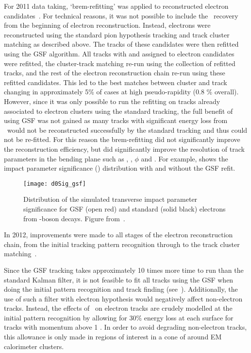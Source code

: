 For 2011 data taking, `brem-refitting' was applied to
reconstructed electron candidates~\cite{ATLAS-CONF-2012-047}. For technical reasons, it was not possible to
include the \brem\ recovery from the beginning of electron reconstruction.
Instead, electrons were reconstructed using the standard pion hypothesis
tracking and track cluster matching as described above. The tracks of these candidates were then refitted
using the GSF algorithm. All tracks with  and  assigned to
electron candidates were refitted, the cluster-track matching re-run
using the collection of refitted tracks, and the rest of the electron reconstruction
chain re-run using these refitted candidates. This led to the best matches between
cluster and track changing in approximately 5\% of cases at high pseudo-rapidity (0.8 \%
overall). However, since it was only possible to run the refitting on tracks
already associated to electron clusters using the standard tracking, the full
benefit of using GSF was not gained as many tracks with significant energy loss
from \brem\ would not be reconstructed successfully by the standard tracking and
thus could not be re-fitted. For this reason the brem-refitting did not
significantly improve the reconstruction efficiency, but did significantly
improve the resolution of track parameters in the bending plane such as \dzero, \dzerosig,
$\phi$ and \qoverp. For example,  shows the impact parameter
significance (\dzerosig) distribution with and without the GSF refit. 

\begin{figure}[h!]
\centering
            \texttt{[image: d0Sig\_gsf]}
\caption{
Distribution of the simulated transverse impact parameter significance for GSF (open
red) and standard (solid black) electrons from \Z-boson decays. 
Figure from~\cite{ATLAS-CONF-2012-047}.}
\label{fig:d0Sig-gsf}
\end{figure}


In 2012, improvements were made to all stages of the electron reconstruction
chain, from the initial tracking pattern recognition through to the track
cluster matching~\cite{HSG2:1456228}. 

Since the GSF tracking takes approximately 10 times more time to
run than the standard Kalman filter, it is not feasible to fit all tracks using
the GSF when doing the initial pattern recognition and track finding (see~). 
Additionally, the use of such a filter with electron hypothesis would
negatively affect non-electron tracks. Instead, the effects of \brem\ on
electron tracks are crudely modelled at the initial pattern recognition by allowing for 30\% energy loss at each surface for tracks with
momentum above 1 \gev. In order to avoid degrading non-electron tracks, this allowance is only made in regions of interest in a
cone of  around EM calorimeter clusters. 

